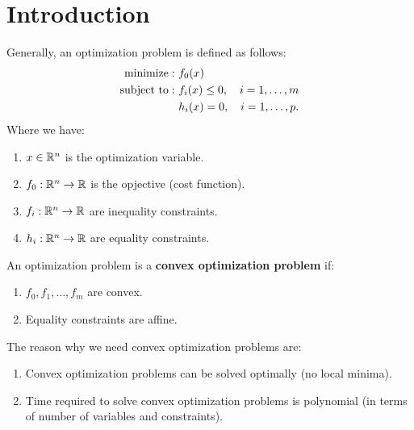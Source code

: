 \newcommand{\cvxopt}{{\bf CVXOPT}}
\section{Introduction}
\begin{definition}
	Generally, an optimization problem is defined as follows:
	\begin{equation}\begin{aligned}
		\textup{minimize}: 		& \ f_0(x) \\
		\textup{subject to}: 	& \ f_i(x) \le 0, \quad i = 1, \dots, m \\
								& \ h_i(x) = 0, \quad i = 1, \dots, p.	
	\end{aligned}\end{equation} 
	\noindent Where we have:
	\begin{enumerate}
		\item $x\in\mathbb{R}^n$ is the optimization variable.
		\item $f_0:\mathbb{R}^n\to\mathbb{R}$ is the opjective (cost function).
		\item $f_i:\mathbb{R}^n\to\mathbb{R}$ are inequality constraints.
		\item $h_i:\mathbb{R}^n\to\mathbb{R}$ are equality constraints.
	\end{enumerate} 
\end{definition} 

\begin{definition}
	\noindent An optimization problem is a \textbf{convex optimization problem} if:
	\begin{enumerate}
		\item $f_0, f_1, \dots, f_m$ are convex.
		\item Equality constraints are affine.
	\end{enumerate} 
\end{definition} 

\noindent The reason why we need convex optimization problems are:
\begin{enumerate}
	\item Convex optimization problems can be solved optimally (no local minima).
	\item Time required to solve convex optimization problems is polynomial (in terms of number of variables and constraints).
\end{enumerate} 